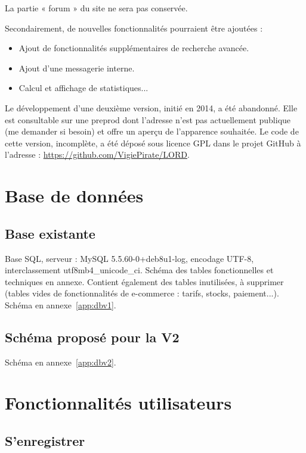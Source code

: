 \documentclass[a4paper,10pt]{article}
\begin{document}
La partie « forum » du site ne sera pas conservée.   

Secondairement, de nouvelles fonctionnalités pourraient être ajoutées :
\begin{itemize}
\item Ajout de fonctionnalités supplémentaires de recherche avancée.
\item Ajout d'une messagerie interne.
\item Calcul et affichage de statistiques...
\end{itemize}

Le développement d'une deuxième version, initié en 2014, a été abandonné. Elle est consultable sur une preprod dont l'adresse n'est pas actuellement publique (me demander si besoin) et offre un aperçu de l'apparence souhaitée. Le code de cette version, incomplète, a été déposé sous licence GPL dans le projet GitHub à l'adresse :
\url{https://github.com/VigiePirate/LORD}.



\section{Base de données}
\subsection{Base existante}
Base SQL, serveur : MySQL 5.5.60-0+deb8u1-log, encodage UTF-8, interclassement utf8mb4\_unicode\_ci. Schéma des tables fonctionnelles et techniques en annexe. Contient également des tables inutilisées, à supprimer (tables vides de fonctionnalités de e-commerce : tarifs, stocks, paiement...). Schéma en annexe~\ref{app:dbv1}.


\subsection{Schéma proposé pour la V2}

Schéma en annexe~\ref{app:dbv2}.

\section{Fonctionnalités utilisateurs}
\subsection{S'enregistrer}
\end{document}
